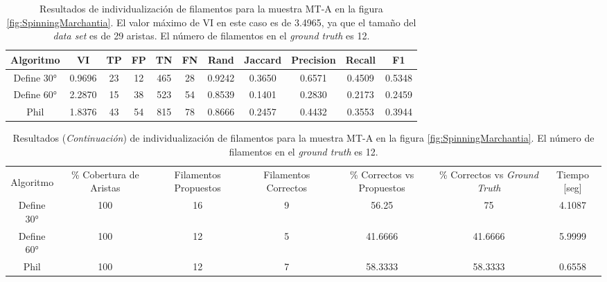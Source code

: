\begin{table}[h]
    \centering
    \begin{tabular}{|c|c|c|c|c|c|c|c|c|c|c|}
    \hline
        Algoritmo & VI & TP & FP &TN &FN & Rand	& Jaccard &	Precision &	Recall &	F1 \\ \hline
        Define 30° & 0.9696 & 23 & 12 & 465 & 28 & 0.9242 & 0.3650 & 0.6571 & 0.4509  & 0.5348 \\ 
        Define 60° & 2.2870  & 15 & 38 & 523 & 54 & 0.8539 & 0.1401 & 0.2830 & 0.2173 & 0.2459\\
        Phil & 1.8376 & 43 & 54 & 815 & 78 & 0.8666 & 0.2457 & 0.4432 & 0.3553 & 0.3944 \\
        \hline
    \end{tabular}
    \caption{Resultados de individualizaci\'on de filamentos para la muestra MT-A en la figura \ref{fig:SpinningMarchantia}. El valor m\'aximo de VI en este caso es de 3.4965, ya que el tama\~no del {\it data set} es de 29 aristas. El n\'umero de filamentos en el {\it ground truth} es 12.}
    \label{tab:SpinningMarchantiaResults1}
\end{table}
\addtocounter{table}{-1}
\begin{table}[h]
    \centering
    \begin{tabular}{|c|c|c|c|c|c|c|}
    \hline
         & \multirow{4}{2cm}{\centering \% Cobertura de Aristas} & \multirow{4}{2cm}{Filamentos Propuestos} & \multirow{4}{2cm}{Filamentos Correctos} & \multirow{4}{2.5cm}{\% Correctos vs Propuestos} & \multirow{4}{2.5cm}{\centering \% Correctos vs {\it Ground Truth}} & \multirow{4}{1.2cm}{\centering Tiempo [seg]} \\
         &  &  &  & & &  \\
        Algoritmo &  &  &  & & &  \\
        &  &  &  & & &  \\ \hline
        Define 30° & 100 & 16 & 9 & 56.25       & 75          & 4.1087 \\
        Define 60° & 100 & 12 & 5 & 41.6666 & 41.6666 & 5.9999 \\ 
        Phil & 100 & 12 & 7 & 58.3333 & 58.3333 & 0.6558 \\
        \hline
    \end{tabular}
    \caption{Resultados ({\it Continuaci\'on}) de individualizaci\'on de filamentos para la muestra MT-A en la figura \ref{fig:SpinningMarchantia}. El n\'umero de filamentos en el {\it ground truth} es 12.}
\end{table}



